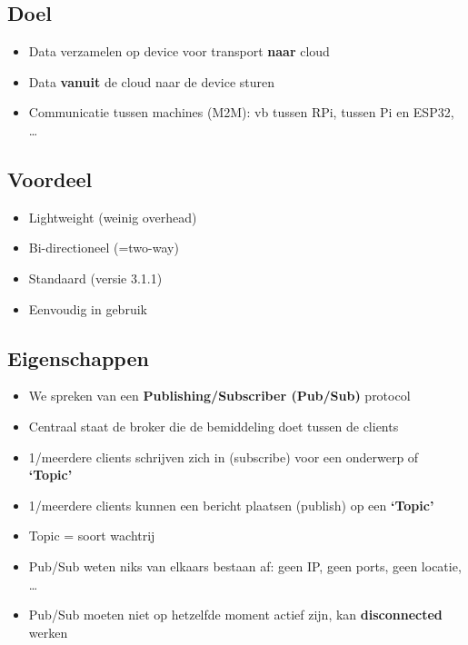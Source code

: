 \documentclass{article}
\newcommand{\bold}[1]{\textbf{#1}}
\begin{document}
\subsection{Doel}
\begin{itemize}
    \item Data verzamelen op device voor transport \bold{naar} cloud
    \item Data \bold{vanuit} de cloud naar de device sturen
    \item Communicatie tussen machines (M2M): vb tussen RPi, tussen Pi en ESP32, \dots
\end{itemize}

\subsection{Voordeel}
\begin{itemize}
    \item Lightweight (weinig overhead)
    \item Bi-directioneel (=two-way)
    \item Standaard (versie 3.1.1)
    \item Eenvoudig in gebruik
\end{itemize}

\subsection{Eigenschappen}

\begin{itemize}
    \item We spreken van een \bold{Publishing/Subscriber (Pub/Sub)} protocol
    \item Centraal staat de broker die de bemiddeling doet tussen de clients
    \item 1/meerdere clients schrijven zich in (subscribe) voor een onderwerp of \bold{`Topic'}
    \item 1/meerdere clients kunnen een bericht plaatsen (publish) op een \bold{`Topic'}
    \item Topic = soort wachtrij
    \item Pub/Sub weten niks van elkaars bestaan af: geen IP, geen ports, geen locatie, \dots
    \item Pub/Sub moeten niet op hetzelfde moment actief zijn, kan \bold{disconnected} werken
\end{itemize}
\end{document}
